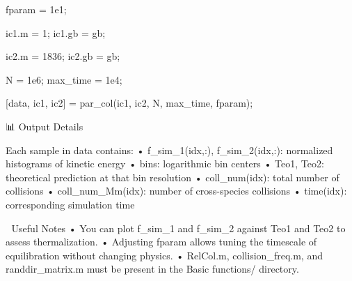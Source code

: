 fparam = 1e1;

ic1.m = 1;      %
ic1.gb = gb;    %

ic2.m = 1836;   %
ic2.gb = gb;    %

N = 1e6;           %
max_time = 1e4;    %

[data, ic1, ic2] = par_col(ic1, ic2, N, max_time, fparam);


📊 Output Details

Each sample in data contains:
	•	f_sim_1(idx,:), f_sim_2(idx,:): normalized histograms of kinetic energy
	•	bins: logarithmic bin centers
	•	Teo1, Teo2: theoretical prediction at that bin resolution
	•	coll_num(idx): total number of collisions
	•	coll_num_Mm(idx): number of cross-species collisions
	•	time(idx): corresponding simulation time

🧠 Useful Notes
	•	You can plot f_sim_1 and f_sim_2 against Teo1 and Teo2 to assess thermalization.
	•	Adjusting fparam allows tuning the timescale of equilibration without changing physics.
	•	RelCol.m, collision_freq.m, and randdir_matrix.m must be present in the Basic functions/ directory.

